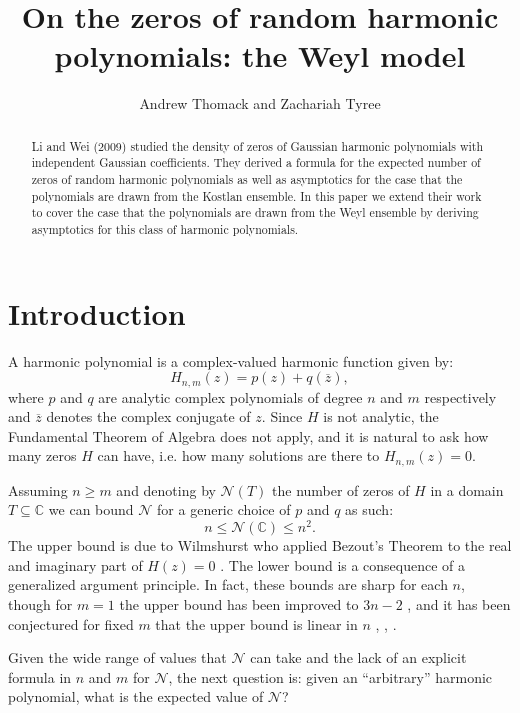 \documentclass[12pt]{amsart}
\theoremstyle{remark}
\begin{document}
\author[A. Thomack, Z. Tyree]{Andrew Thomack and Zachariah Tyree}
\title[Random harmonic polynomials]{On the zeros of random harmonic polynomials: the Weyl model}

\begin{abstract}
Li and Wei (2009) studied the density of zeros of Gaussian harmonic polynomials with independent Gaussian coefficients. They derived a formula for the expected number of zeros of random harmonic polynomials as well as asymptotics for the case that the polynomials are drawn from the Kostlan ensemble. In this paper we extend their work to cover the case that the polynomials are drawn from the Weyl ensemble by deriving asymptotics for this class of harmonic polynomials.
\end{abstract}

\maketitle

\section{Introduction}
A harmonic polynomial is a complex-valued harmonic function given by:
\[H_{n,m}(z)=p(z)+q(\overline{z}),\]
where $p$ and $q$ are analytic complex polynomials of degree $n$ and $m$ respectively and $\overline{z}$ denotes the complex conjugate of $z$.  Since $H$ is not analytic, the Fundamental Theorem of Algebra does not apply, and it is natural to ask how many zeros $H$ can have, i.e. how many solutions are there to $H_{n,m}(z)=0$.

Assuming $n\ge m$ and denoting by $\mathcal{N}(T)$ the number of zeros of $H$ in a domain $T\subseteq\mathbb{C}$ we can bound $\mathcal{N}$  for a generic choice of $p$ and $q$ as such:
\[n\le\mathcal{N}(\mathbb{C})\le n^2.\]
The upper bound is due to Wilmshurst who applied Bezout's Theorem to the real and imaginary part of $H(z)=0$ \cite{Wilmshurst}.  The lower bound is a consequence of a generalized argument principle.  In fact, these bounds are sharp for each $n$, though for $m=1$ the upper bound has been improved to $3n-2$ \cite{Khavinson}, and it has been conjectured for fixed $m$ that the upper bound is linear in $n$ \cite{Saez}, \cite{Lee}, \cite{Wilmshurst}.

Given the wide range of values that $\mathcal{N}$ can take and the lack of an explicit formula in $n$ and $m$ for $\mathcal{N}$, the next question is: given an ``arbitrary'' harmonic polynomial, what is the expected value of $\mathcal{N}$?
\end{document}
